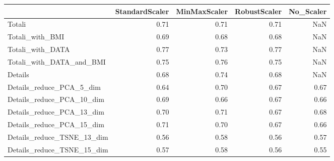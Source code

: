 \documentclass[12pt,italian]{report}
\begin{document}
\begin{table}[h]
	\begin{center}
		\begin{adjustbox}{max width=\textwidth}
			\begin{tabular}{lrrrr}
				\toprule
				{} &  StandardScaler &  MinMaxScaler &  RobustScaler &  No\_Scaler \\
				\midrule
				Totali                     &        0.71 &      0.71 &      0.71 &        NaN \\
				Totali\_with\_BMI            &        0.69 &      0.68 &      0.68 &        NaN \\
				Totali\_with\_DATA           &        \cellcolor{orange}0.77 &      0.73 &      \cellcolor{orange}0.77 &        NaN \\
				Totali\_with\_DATA\_and\_BMI   &        0.75 &      0.76 &      0.75 &        NaN \\
				Details                    &        0.68 &      0.74 &      0.68 &        NaN \\
				Details\_reduce\_PCA\_5\_dim   &        0.64 &      0.70 &      0.67 &   0.67 \\
				Details\_reduce\_PCA\_10\_dim  &        0.69 &      0.66 &      0.67 &   0.66 \\
				Details\_reduce\_PCA\_13\_dim  &        0.70 &      0.71 &      0.67 &   0.68 \\
				Details\_reduce\_PCA\_15\_dim  &        0.71 &      0.70 &      0.67 &   0.66 \\
				Details\_reduce\_TSNE\_13\_dim &        0.56 &      0.58 &      0.56 &   0.57 \\
				Details\_reduce\_TSNE\_15\_dim &        0.57 &      0.58 &      0.56 &   0.55 \\
				\bottomrule
			\end{tabular}
		\end{adjustbox}
	\end{center}
\end{table}
\clearpage
\end{document}
